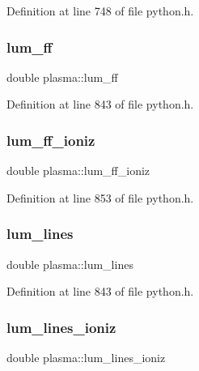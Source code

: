 Definition at line 748 of file python.\+h.

\mbox{\label{structplasma_ae9f6828f63719a3dc2f172573293c4a1}} 
\subsubsection{\texorpdfstring{lum\+\_\+ff}{lum\_ff}}
{\footnotesize\ttfamily double plasma\+::lum\+\_\+ff}



Definition at line 843 of file python.\+h.

\mbox{\label{structplasma_ab206d43d8bc66c44371da287b69fd5da}} 
\subsubsection{\texorpdfstring{lum\+\_\+ff\+\_\+ioniz}{lum\_ff\_ioniz}}
{\footnotesize\ttfamily double plasma\+::lum\+\_\+ff\+\_\+ioniz}



Definition at line 853 of file python.\+h.

\mbox{\label{structplasma_a2c31ecbd91d20cf9f4112db1d6150764}} 
\subsubsection{\texorpdfstring{lum\+\_\+lines}{lum\_lines}}
{\footnotesize\ttfamily double plasma\+::lum\+\_\+lines}



Definition at line 843 of file python.\+h.

\mbox{\label{structplasma_ae8458741703e0a2a71f1b425600b1694}} 
\subsubsection{\texorpdfstring{lum\+\_\+lines\+\_\+ioniz}{lum\_lines\_ioniz}}
{\footnotesize\ttfamily double plasma\+::lum\+\_\+lines\+\_\+ioniz}



